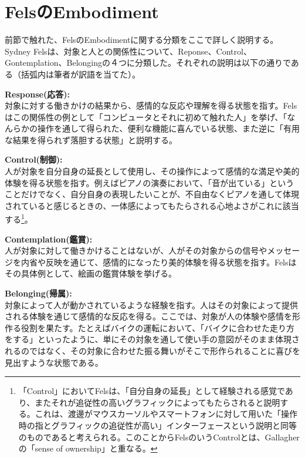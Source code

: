 \section{FelsのEmbodiment}
前節で触れた、FelsのEmbodimentに関する分類をここで詳しく説明する。
Sydney Felsは、対象と人との関係性について、Reponse、Control、Gontemplation、Belongingの４つに分類した\cite{Fels, Costello2005}。それぞれの説明は以下の通りである（括弧内は筆者が訳語を当てた）。

\textbf{Response(応答):}\\
対象に対する働きかけの結果から、感情的な反応や理解を得る状態を指す。Felsはこの関係性の例として「コンピュータとそれに初めて触れた人」を挙げ、「なんらかの操作を通して得られた、便利な機能に喜んでいる状態、また逆に「有用な結果を得られず落胆する状態」と説明する。

\textbf{Control(制御):}\\
人が対象を自分自身の延長として使用し、その操作によって感情的な満足や美的体験を得る状態を指す。例えばピアノの演奏において、「音が出ている」ということだけでなく、自分自身の表現したいことが、不自由なくピアノを通して体現されていると感じるときの、一体感によってもたらされる心地よさがこれに該当する\footnote{「Control」においてFelsは、「自分自身の延長」として経験される感覚であり、またそれが追従性の高いグラフィックによってもたらされると説明する。これは、渡邊がマウスカーソルやスマートフォンに対して用いた「操作時の指とグラフィックの追従性が高い」インターフェースという説明と同等のものであると考えられる。このことからFelsのいうControlとは、Gallagherの「sense of ownership」と重なる。}。

\textbf{Contemplation(鑑賞):}\\
人が対象に対して働きかけることはないが、人がその対象からの信号やメッセージを内省や反映を通じて、感情的になったり美的体験を得る状態を指す。Felsはその具体例として、絵画の鑑賞体験を挙げる。

\textbf{Belonging(帰属):}\\
対象によって人が動かされているような経験を指す。人はその対象によって提供される体験を通じて感情的な反応を得る。ここでは、対象が人の体験や感情を形作る役割を果たす。たとえばバイクの運転において、「バイクに合わせた走り方をする」といったように、単にその対象を通して使い手の意図がそのまま体現されるのではなく、その対象に合わせた振る舞いがそこで形作られることに喜びを見出すような状態である。

